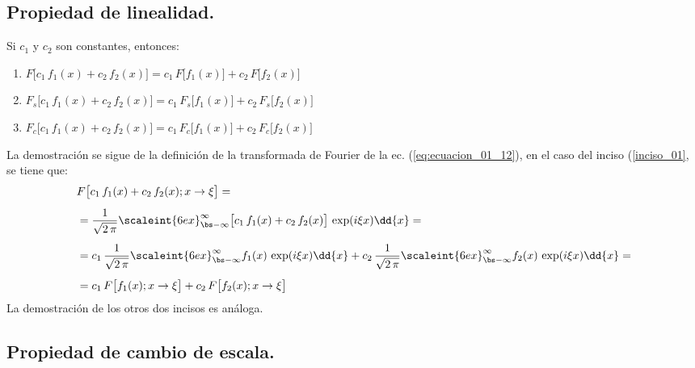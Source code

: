 \subsection{Propiedad de linealidad.}

Si $c_{1}$ y $c_{2}$ son constantes, entonces:
\begin{enumerate}[\thesubsection .1)]
\item \label{inciso_01} $F \big[ c_{1} \, f_{1} (x) + c_{2} \, f_{2} (x) \big] = c_{1} \, F \big[ f_{1} (x) \big] + c_{2} \, F \big[ f_{2} (x) \big]$
\item $F_{s} \big[ c_{1} \, f_{1} (x) + c_{2} \, f_{2} (x) \big] = c_{1} \, F_{s} \big[ f_{1} (x) \big] + c_{2} \, F_{s} \big[ f_{2} (x) \big]$
\item $F_{c} \big[ c_{1} \, f_{1} (x) + c_{2} \, f_{2} (x) \big] = c_{1} \, F_{c} \big[ f_{1} (x) \big] + c_{2} \, F_{c} \big[ f_{2} (x) \big]$
\end{enumerate}
La demostración se sigue de la definición de la transformada de Fourier de la ec. (\ref{eq:ecuacion_01_12}), en el caso del inciso (\ref{inciso_01}, se tiene que: 
\begin{align*}
&F \big[ c_{1} \, f_{1} (x) + c_{2} \, f_{2} (x) ; x \to \xi \big] = \\[0.5em]
&= \dfrac{1}{\sqrt{2 \, \pi}} \scaleint{6ex}_{\bs -\infty}^{\infty} \big[ c_{1} \, f_{1} (x) + c_{2} \, f_{2} (x) \big] \, \exp(i \xi x) \dd{x} = \\[0.5em]
&= c_{1} \, \dfrac{1}{\sqrt{2 \, \pi}} \scaleint{6ex}_{\bs -\infty}^{\infty} f_{1}(x) \, \exp(i \xi x) \dd{x} + c_{2} \, \dfrac{1}{\sqrt{2 \, \pi}} \scaleint{6ex}_{\bs -\infty}^{\infty} f_{2}(x) \, \exp(i \xi x) \dd{x} = \\[0.5em]
&= c_{1} \, F \big[ f_{1} (x) ; x \to \xi \big] + c_{2} \, F \big[ f_{2} (x) ; x \to \xi \big]
\end{align*}
La demostración de los otros dos incisos es análoga.

\subsection{Propiedad de cambio de escala.}

